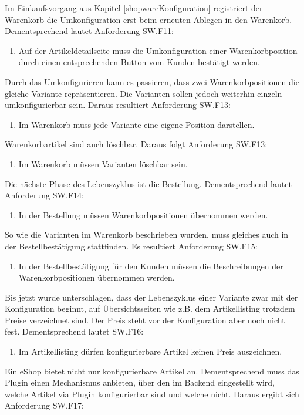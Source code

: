 \documentclass[11pt, a4paper, titlepage, listof=totoc, bibliography=totoc, index=totoc, twoside, openright, headings=normal, draft]{scrreprt}
\begin{document}
Im Einkaufsvorgang aus Kapitel \ref{shopwareKonfiguration} registriert der Warenkorb die Umkonfiguration erst beim erneuten Ablegen in den Warenkorb. Dementsprechend lautet Anforderung SW.F11:
\begin{enumerate}[SW.F11:]\bfseries
\item Auf der Artikeldetailseite muss die Umkonfiguration einer Warenkorbposition durch einen entsprechenden Button vom Kunden bestätigt werden.
\end{enumerate}
Durch das Umkonfigurieren kann es passieren, dass zwei Warenkorbpositionen die gleiche Variante repräsentieren. Die Varianten sollen jedoch weiterhin einzeln umkonfigurierbar sein. Daraus resultiert Anforderung SW.F13:
\begin{enumerate}[SW.F13:]\bfseries
\item Im Warenkorb muss jede Variante eine eigene Position darstellen.
\end{enumerate}
Warenkorbartikel sind auch löschbar. Daraus folgt Anforderung SW.F13:
\begin{enumerate}[SW.F13:]\bfseries
\item Im Warenkorb müssen Varianten löschbar sein.
\end{enumerate}
Die nächste Phase des Lebenszyklus ist die Bestellung. Dementsprechend lautet Anforderung SW.F14:
\begin{enumerate}[SW.F14:]\bfseries
\item In der Bestellung müssen Warenkorbpositionen übernommen werden.
\end{enumerate}
So wie die Varianten im Warenkorb beschrieben wurden, muss gleiches auch in der Bestellbestätigung stattfinden. Es resultiert Anforderung SW.F15:
\begin{enumerate}[SW.F15:]\bfseries
\item In der Bestellbestätigung für den Kunden müssen die Beschreibungen der Warenkorbpositionen übernommen werden.
\end{enumerate}
Bis jetzt wurde unterschlagen, dass der Lebenszyklus einer Variante zwar mit der Konfiguration beginnt, auf Übersichtsseiten wie z.B. dem Artikellisting trotzdem Preise verzeichnet sind. Der Preis steht vor der Konfiguration aber noch nicht fest. Dementsprechend lautet SW.F16:
\begin{enumerate}[SW.F16:]\bfseries
\item Im Artikellisting dürfen konfigurierbare Artikel keinen Preis auszeichnen.
\end{enumerate}
Ein eShop bietet nicht nur konfigurierbare Artikel an. Dementsprechend muss das Plugin einen Mechanismus anbieten, über den im Backend eingestellt wird, welche Artikel via Plugin konfigurierbar sind und welche nicht. Daraus ergibt sich Anforderung SW.F17:
\end{document}
